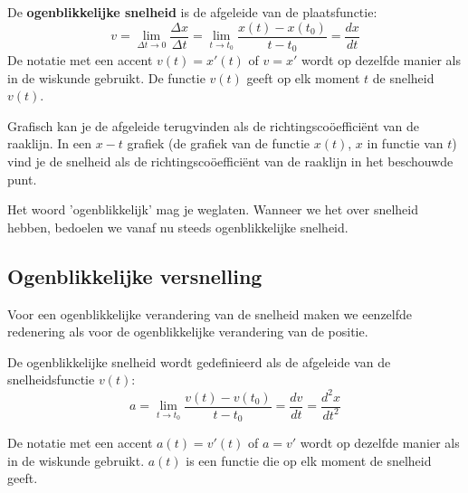 \documentclass{ximera}
\begin{document}
\begin{definition}
	
De \textbf{ogenblikkelijke snelheid}  is de afgeleide van de plaatsfunctie:
\[
v=\lim_{\Delta t\to 0}\frac{\Delta x}{\Delta t}=\lim_{t\to t_0}\frac{x(t)-x(t_0)}{t-t_0}=\frac{dx}{dt}
\]
De notatie met een accent $v(t)=x'(t)$ of $v=x'$ wordt op dezelfde manier als in de wiskunde gebruikt. 
De functie $v(t)$ geeft op elk moment $t$ de snelheid $v(t)$. 
\end{definition}


Grafisch kan je de afgeleide terugvinden als de richtingscoöefficiënt van de raaklijn. In een $x-t$ grafiek (de grafiek van de functie $x(t)$, $x$ in functie van $t$) vind je  de snelheid als de richtingscoöefficiënt van de raaklijn in het beschouwde punt. 

\begin{remark}
	Het woord 'ogenblikkelijk' mag je weglaten. Wanneer we het over snelheid hebben, bedoelen we vanaf nu steeds ogenblikkelijke snelheid.
\end{remark}

\subsection*{Ogenblikkelijke versnelling}

Voor een ogenblikkelijke verandering van de snelheid maken we eenzelfde redenering als voor de ogenblikkelijke verandering van de positie.

\begin{definition}
De ogenblikkelijke snelheid wordt gedefinieerd als de afgeleide van de snelheidsfunctie \(v(t)\):
\[
a=\lim_{t\to t_0}\frac{v(t)-v(t_0)}{t-t_0} = \frac{dv}{dt}=\frac{d^2x}{dt^2}
\]

De notatie met een accent $a(t)=v'(t)$ of $a=v'$ wordt op dezelfde manier als in de wiskunde gebruikt. $a(t)$ is een functie die op elk moment de snelheid geeft. 
\end{definition}
	
	
\end{document}
